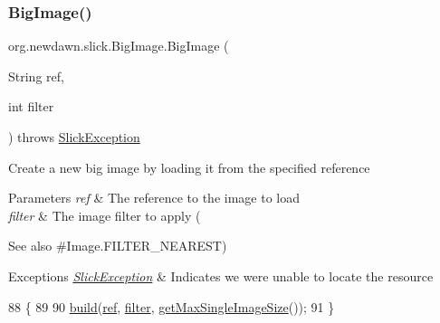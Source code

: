 \subsubsection{\texorpdfstring{Big\+Image()}{BigImage()}\hspace{0.1cm}{\footnotesize\ttfamily [3/6]}}
{\footnotesize\ttfamily org.\+newdawn.\+slick.\+Big\+Image.\+Big\+Image (\begin{DoxyParamCaption}\item[{String}]{ref,  }\item[{int}]{filter }\end{DoxyParamCaption}) throws \mbox{\hyperlink{classorg_1_1newdawn_1_1slick_1_1_slick_exception}{Slick\+Exception}}\hspace{0.3cm}{\ttfamily [inline]}}

Create a new big image by loading it from the specified reference


\begin{DoxyParams}{Parameters}
{\em ref} & The reference to the image to load \\
\hline
{\em filter} & The image filter to apply (\\
\hline
\end{DoxyParams}
\begin{DoxySeeAlso}{See also}
\#\+Image.\+F\+I\+L\+T\+E\+R\+\_\+\+N\+E\+A\+R\+E\+ST) 
\end{DoxySeeAlso}

\begin{DoxyExceptions}{Exceptions}
{\em \mbox{\hyperlink{classorg_1_1newdawn_1_1slick_1_1_slick_exception}{Slick\+Exception}}} & Indicates we were unable to locate the resource \\
\hline
\end{DoxyExceptions}

\begin{DoxyCode}
88                                                                  \{
89         
90         \mbox{\hyperlink{classorg_1_1newdawn_1_1slick_1_1_big_image_a22a00890a41ddf7c996a84b2bc32621b}{build}}(\mbox{\hyperlink{classorg_1_1newdawn_1_1slick_1_1_image_a32694687591a80299d8b8ad1ea070cee}{ref}}, \mbox{\hyperlink{classorg_1_1newdawn_1_1slick_1_1_image_a1c6f09687817420f3762f32bb1c3ed76}{filter}}, \mbox{\hyperlink{classorg_1_1newdawn_1_1slick_1_1_big_image_a9f630e56a300dc74c6403b290a56c059}{getMaxSingleImageSize}}());
91     \}
\end{DoxyCode}
\mbox{\label{classorg_1_1newdawn_1_1slick_1_1_big_image_a0be1790789554eaa16edb744746f2f29}} 
